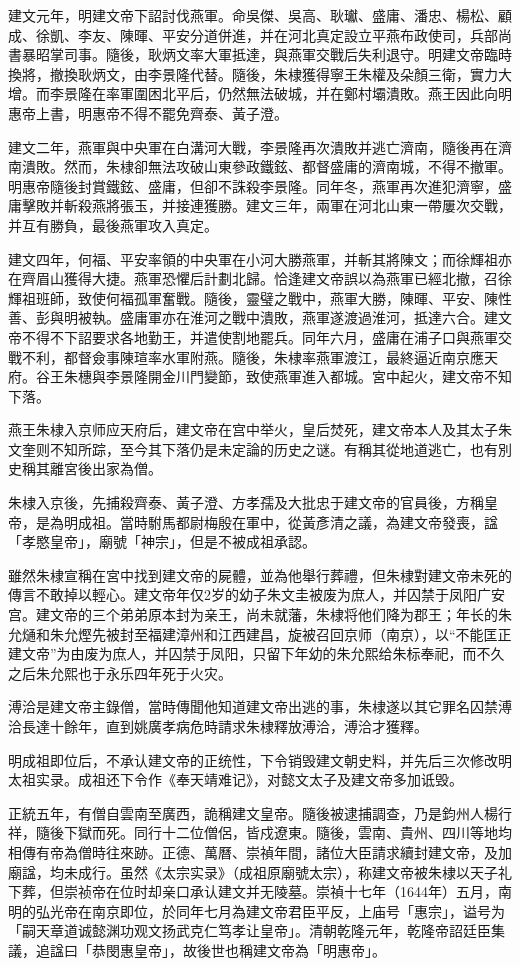 建文元年，明建文帝下詔討伐燕軍。命吳傑、吳高、耿瓛、盛庸、潘忠、楊松、顧成、徐凱、李友、陳暉、平安分道併進，并在河北真定設立平燕布政使司，兵部尚書暴昭掌司事。隨後，耿炳文率大軍抵達，與燕軍交戰后失利退守。明建文帝臨時換將，撤換耿炳文，由李景隆代替。隨後，朱棣獲得寧王朱權及朵顏三衛，實力大增。而李景隆在率軍圍困北平后，仍然無法破城，并在鄭村壩潰敗。燕王因此向明惠帝上書，明惠帝不得不罷免齊泰、黃子澄。

建文二年，燕軍與中央軍在白溝河大戰，李景隆再次潰敗并逃亡濟南，隨後再在濟南潰敗。然而，朱棣卻無法攻破山東參政鐵鉉、都督盛庸的濟南城，不得不撤軍。明惠帝隨後封賞鐵鉉、盛庸，但卻不誅殺李景隆。同年冬，燕軍再次進犯濟寧，盛庸擊敗并斬殺燕將張玉，并接連獲勝。建文三年，兩軍在河北山東一帶屢次交戰，并互有勝負，最後燕軍攻入真定。

建文四年，何福、平安率領的中央軍在小河大勝燕軍，并斬其將陳文；而徐輝祖亦在齊眉山獲得大捷。燕軍恐懼后計劃北歸。恰逢建文帝誤以為燕軍已經北撤，召徐輝祖班師，致使何福孤軍奮戰。隨後，靈璧之戰中，燕軍大勝，陳暉、平安、陳性善、彭與明被執。盛庸軍亦在淮河之戰中潰敗，燕軍遂渡過淮河，抵達六合。建文帝不得不下詔要求各地勤王，并遣使割地罷兵。同年六月，盛庸在浦子口與燕軍交戰不利，都督僉事陳瑄率水軍附燕。隨後，朱棣率燕軍渡江，最終逼近南京應天府。谷王朱橞與李景隆開金川門變節，致使燕軍進入都城。宮中起火，建文帝不知下落。

燕王朱棣入京师应天府后，建文帝在宫中举火，皇后焚死，建文帝本人及其太子朱文奎则不知所踪，至今其下落仍是未定論的历史之谜。有稱其從地道逃亡，也有別史稱其離宮後出家為僧。

朱棣入京後，先捕殺齊泰、黃子澄、方孝孺及大批忠于建文帝的官員後，方稱皇帝，是為明成祖。當時駙馬都尉梅殷在軍中，從黃彥清之議，為建文帝發喪，諡「孝愍皇帝」，廟號「神宗」，但是不被成祖承認。

雖然朱棣宣稱在宮中找到建文帝的屍體，並為他舉行葬禮，但朱棣對建文帝未死的傳言不敢掉以輕心。建文帝年仅2岁的幼子朱文圭被废为庶人，并囚禁于凤阳广安宫。建文帝的三个弟弟原本封为亲王，尚未就藩，朱棣将他们降为郡王；年长的朱允熥和朱允熞先被封至福建漳州和江西建昌，旋被召回京师（南京），以“不能匡正建文帝”为由废为庶人，并囚禁于凤阳，只留下年幼的朱允熙给朱标奉祀，而不久之后朱允熙也于永乐四年死于火灾。

溥洽是建文帝主錄僧，當時傳聞他知道建文帝出逃的事，朱棣遂以其它罪名囚禁溥洽長達十餘年，直到姚廣孝病危時請求朱棣釋放溥洽，溥洽才獲釋。

明成祖即位后，不承认建文帝的正统性，下令销毁建文朝史料，并先后三次修改明太祖实录。成祖还下令作《奉天靖难记》，对懿文太子及建文帝多加诋毁。

正統五年，有僧自雲南至廣西，詭稱建文皇帝。隨後被逮捕調查，乃是鈞州人楊行祥，隨後下獄而死。同行十二位僧侶，皆戍遼東。隨後，雲南、貴州、四川等地均相傳有帝為僧時往來跡。正德、萬曆、崇禎年間，諸位大臣請求續封建文帝，及加廟諡，均未成行。虽然《太宗实录》（成祖原廟號太宗），称建文帝被朱棣以天子礼下葬，但崇祯帝在位时却亲口承认建文并无陵墓。崇禎十七年（1644年）五月，南明的弘光帝在南京即位，於同年七月為建文帝君臣平反，上庙号「惠宗」，谥号为「嗣天章道诚懿渊功观文扬武克仁笃孝让皇帝」。清朝乾隆元年，乾隆帝詔廷臣集議，追諡曰「恭閔惠皇帝」，故後世也稱建文帝為「明惠帝」。

